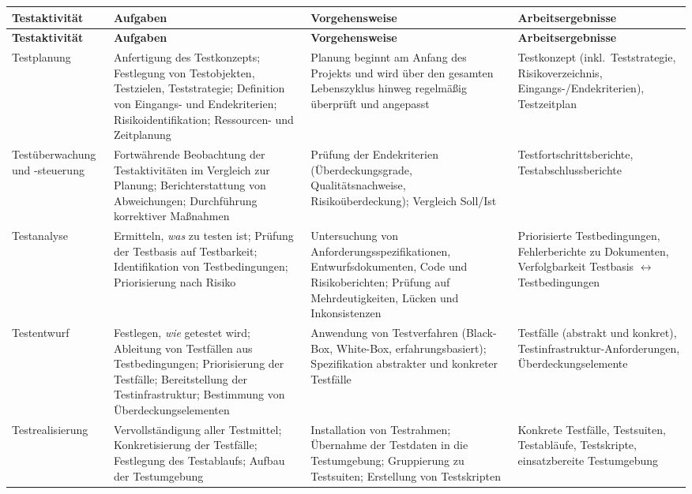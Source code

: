 \documentclass[
	fontsize=12pt,          %
	paper=a4,               %
	numbers=noenddot,       %
	listof=totoc,           %
	listof=entryprefix,     %
	listof=nochaptergap,    %
	bibliography=totoc,     %
	parskip=half,           %
	openany                 %
]{scrbook}
\begin{document}
{\small
\begin{longtable}{| p{3cm} | p{3.8cm} | p{3.8cm} | p{3.4cm} |}
	\toprule
	\textbf{Testaktivität} & \textbf{Aufgaben} & \textbf{Vorgehensweise} & \textbf{Arbeitsergebnisse} \\
	\midrule
	\endfirsthead
	\toprule
	\textbf{Testaktivität} & \textbf{Aufgaben} & \textbf{Vorgehensweise} & \textbf{Arbeitsergebnisse} \\
	\midrule
	\endhead
	\bottomrule
	\endfoot

	Testplanung &
	Anfertigung des Testkonzepts; Festlegung von Testobjekten, Testzielen, Teststrategie; Definition von Eingangs- und Endekriterien; Risikoidentifikation; Ressourcen- und Zeitplanung &
	Planung beginnt am Anfang des Projekts und wird über den gesamten Lebenszyklus hinweg regelmäßig überprüft und angepasst &
	Testkonzept (inkl.\ Teststrategie, Risikoverzeichnis, Eingangs-/Endekriterien), Testzeitplan \\
	\hline

	Testüberwachung und -steuerung &
	Fortwährende Beobachtung der Testaktivitäten im Vergleich zur Planung; Berichterstattung von Abweichungen; Durchführung korrektiver Maßnahmen &
	Prüfung der Endekriterien (Überdeckungsgrade, Qualitätsnachweise, Risikoüberdeckung); Vergleich Soll/Ist &
	Testfortschrittsberichte, Testabschlussberichte \\
	\hline

	Testanalyse &
	Ermitteln, \emph{was} zu testen ist; Prüfung der Testbasis auf Testbarkeit; Identifikation von Testbedingungen; Priorisierung nach Risiko &
	Untersuchung von Anforderungsspezifikationen, Entwurfsdokumenten, Code und Risikoberichten; Prüfung auf Mehrdeutigkeiten, Lücken und Inkonsistenzen &
	Priorisierte Testbedingungen, Fehlerberichte zu Dokumenten, Verfolgbarkeit Testbasis $\leftrightarrow$ Testbedingungen \\
	\hline

	Testentwurf &
	Festlegen, \emph{wie} getestet wird; Ableitung von Testfällen aus Testbedingungen; Priorisierung der Testfälle; Bereitstellung der Testinfrastruktur; Bestimmung von Überdeckungselementen &
	Anwendung von Testverfahren (Black-Box, White-Box, erfahrungsbasiert); Spezifikation abstrakter und konkreter Testfälle &
	Testfälle (abstrakt und konkret), Testinfrastruktur-Anforderungen, Überdeckungselemente \\
	\hline

	Testrealisierung &
	Vervollständigung aller Testmittel; Konkretisierung der Testfälle; Festlegung des Testablaufs; Aufbau der Testumgebung &
	Installation von Testrahmen; Übernahme der Testdaten in die Testumgebung; Gruppierung zu Testsuiten; Erstellung von Testskripten &
	Konkrete Testfälle, Testsuiten, Testabläufe, Testskripte, einsatzbereite Testumgebung \\
	\hline


\end{longtable}}
\end{document}
